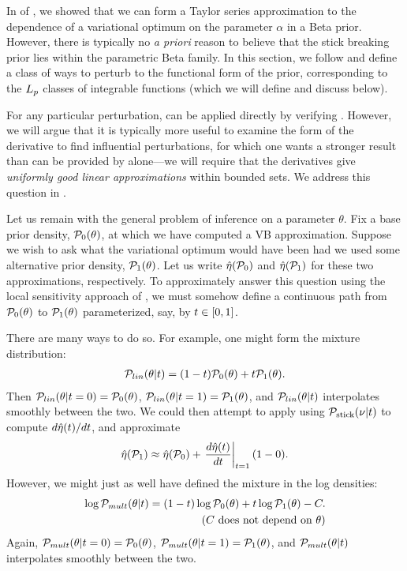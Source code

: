 In  of , we showed that
we can form a Taylor series approximation to the dependence of a variational
optimum on the parameter $\alpha$ in a Beta prior. However, there is typically
no {\em a priori} reason to believe that the stick breaking prior lies within
the parametric Beta family.  In this section, we follow
\citet{gustafson:1996:local} and define a class of ways to perturb to the
functional form of the prior, corresponding to the ${L_{p}}$ classes of
integrable functions (which we will define and discuss below).

For any particular perturbation,  can be applied directly by
verifying .  However, we will argue that it is
typically more useful to examine the form of the derivative to find influential
perturbations, for which one wants a stronger result than can be provided
by  alone---we will require that the derivatives give
{\em uniformly good linear approximations} within bounded sets.
We address this question in .

Let us remain with the general problem of inference on a parameter $\theta$. Fix
a base prior density, $\mathcal{P}_{0}(\theta)$, at which we have computed a VB
approximation.  Suppose we wish to ask what the variational optimum would have
been had we used some alternative prior density, $\mathcal{P}_{1}(\theta)$.  Let us write
$\hat\eta(\mathcal{P}_{0})$ and $\hat\eta(\mathcal{P}_{1})$ for these two approximations,
respectively.  To approximately answer this question using the local sensitivity
approach of , we must somehow define a continuous path
from $\mathcal{P}_{0}(\theta)$ to $\mathcal{P}_{1}(\theta)$ parameterized, say, by $t \in [0, 1]$.

There are many ways to do so.  For example, one might form the mixture
distribution:
%
\begin{align*}
%
\p_{lin}(\theta \vert \t) =
    (1- \t) \pbase(\theta) + \t \palt(\theta).
%
\end{align*}
%
Then $\mathcal{P}_{lin}(\theta \vert t=0) = \mathcal{P}_{0}(\theta)$, $\mathcal{P}_{lin}(\theta \vert t=1) =
\mathcal{P}_{1}(\theta)$, and $\mathcal{P}_{lin}(\theta \vert t)$ interpolates smoothly between the
two.  We could then attempt to apply  using $\mathcal{P}_{\mathrm{stick}}(\nu \vert
t)$ to compute $d\hat\eta(t) / dt$, and approximate
%
\begin{align*}
%
\etaopt(\palt) \approx \etaopt(\pbase) + \fracat{d \etaopt(\t)}{d\t}{\t=1}(1 - 0).
%
\end{align*}
%
However, we might just as well have defined the mixture in the log densities:
%
\begin{align*}
%
\log \p_{mult}(\theta \vert \t) =
    (1- \t) \log\pbase(\theta) + \t \log\palt(\theta) -
    \const. \\ \constdesc{\theta}
%
\end{align*}
%
Again, $\mathcal{P}_{mult}(\theta \vert t=0) = \mathcal{P}_{0}(\theta)$, $\mathcal{P}_{mult}(\theta \vert
t=1) = \mathcal{P}_{1}(\theta)$, and $\mathcal{P}_{mult}(\theta \vert t)$ interpolates smoothly
between the two.

